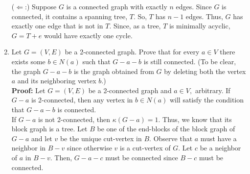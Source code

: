 \documentclass[12pt]{article}
\begin{document}
\begin{enumerate}
($\Longleftarrow$:) Suppose $G$ is a connected graph with exactly $n$ edges. Since $G$ is connected, it contains a spanning tree, $T.$ So, $T$ has $n-1$ edges. Thus, $G$ has exactly one edge that is not in $T.$ Since, as a tree, $T$ is minimally acyclic, $G=T+e$ would have exactly one cycle.\\


\item Let $G=(V,E)$ be a 2-connected graph. Prove that for every $a \in V$ there exists some $b \in N(a)$ such that $G-a-b$ is still connected. (To be clear, the graph $G-a-b$ is the graph obtained from $G$ by deleting both the vertex $a$ and its neighboring vertex $b.$)\\

\textbf{Proof:} Let $G=(V,E)$ be a 2-connected graph and $a \in V,$ arbitrary. If $G-a$ is 2-connected, then any vertex in $b \in N(a)$ will satisfy the condition that $G-a-b$ is connected. \\

If $G-a$ is not 2-connected, then $\kappa(G-a)=1.$ Thus, we know that its block graph is a tree. Let $B$ be one of the end-blocks of the block graph of $G-a$ and let $v$ be the unique cut-vertex in $B.$ Observe that $a$ must have a neighbor in $B-v$ since otherwise $v$ is a cut-vertex of $G.$ Let $c$ be a neighbor of $a$ in $B-v.$ Then, $G-a-c$ must be connected since $B-c$ must be connected.  \end{enumerate}
\end{document}
